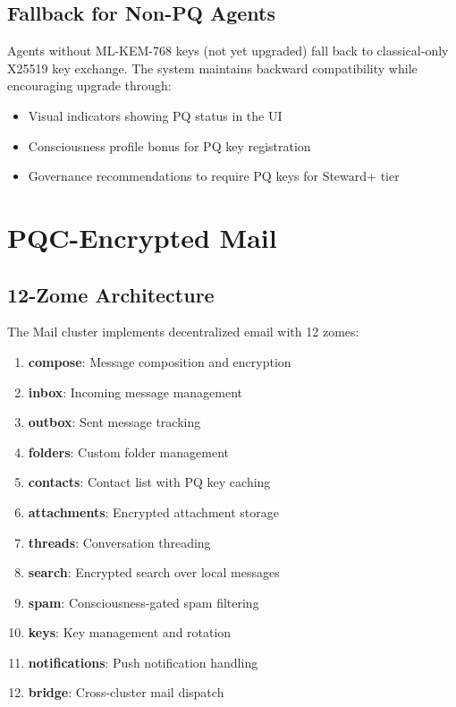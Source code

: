 \documentclass[11pt,twocolumn]{article}
\begin{document}
\subsection{Fallback for Non-PQ Agents}

Agents without ML-KEM-768 keys (not yet upgraded) fall back to classical-only
X25519 key exchange. The system maintains backward compatibility while
encouraging upgrade through:

\begin{itemize}[nosep]
  \item Visual indicators showing PQ status in the UI
  \item Consciousness profile bonus for PQ key registration
  \item Governance recommendations to require PQ keys for Steward+ tier
\end{itemize}

\section{PQC-Encrypted Mail}

\subsection{12-Zome Architecture}

The Mail cluster implements decentralized email with 12 zomes:

\begin{enumerate}[nosep]
  \item \textbf{compose}: Message composition and encryption
  \item \textbf{inbox}: Incoming message management
  \item \textbf{outbox}: Sent message tracking
  \item \textbf{folders}: Custom folder management
  \item \textbf{contacts}: Contact list with PQ key caching
  \item \textbf{attachments}: Encrypted attachment storage
  \item \textbf{threads}: Conversation threading
  \item \textbf{search}: Encrypted search over local messages
  \item \textbf{spam}: Consciousness-gated spam filtering
  \item \textbf{keys}: Key management and rotation
  \item \textbf{notifications}: Push notification handling
  \item \textbf{bridge}: Cross-cluster mail dispatch
\end{enumerate}
\end{document}
